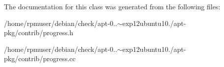 \-The documentation for this class was generated from the following files\-:\begin{DoxyCompactItemize}
\item 
/home/rpmuser/debian/check/apt-\/0..$\sim$exp12ubuntu10./apt-\/pkg/contrib/progress.\-h\item 
/home/rpmuser/debian/check/apt-\/0..$\sim$exp12ubuntu10./apt-\/pkg/contrib/progress.\-cc\end{DoxyCompactItemize}
